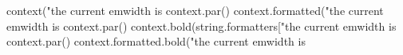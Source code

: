 \startTEXpage

\startluacode

    context("the current emwidth is %
    context.par()
    context.formatted("the current emwidth is %
    context.par()
    context.bold(string.formatters["the current emwidth is %
    context.par()
    context.formatted.bold("the current emwidth is %

\stopluacode

\stopTEXpage
